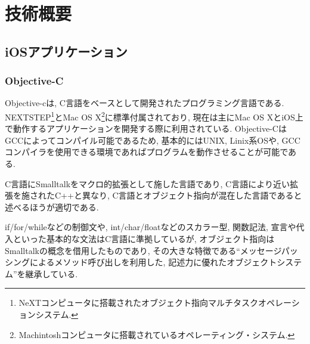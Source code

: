 \chapter{技術概要}
\label{chap:concept}

\section{iOSアプリケーション}
\subsection{Objective-C}
Objective-cは, C言語をベースとして開発されたプログラミング言語である.
NEXTSTEP\footnote{NeXTコンピュータに搭載されたオブジェクト指向マルチタスクオペレーションシステム.}とMac OS X\footnote{Machintoshコンピュータに搭載されているオペレーティング・システム.}に標準付属されており, 現在は主にMac OS XとiOS上で動作するアプリケーションを開発する際に利用されている.
Objective-CはGCCによってコンパイル可能であるため, 基本的にはUNIX, Linix系OSや, GCCコンパイラを使用できる環境であればプログラムを動作させることが可能である.

C言語にSmalltalkをマクロ的拡張として施した言語であり, C言語により近い拡張を施されたC++と異なり, C言語とオブジェクト指向が混在した言語であると述べるほうが適切である.

if/for/whileなどの制御文や, int/char/floatなどのスカラー型, 関数記法, 宣言や代入といった基本的な文法はC言語に準拠しているが, オブジェクト指向はSmalltalkの概念を借用したものであり, その大きな特徴である“メッセージパッシングによるメソッド呼び出しを利用した, 記述力に優れたオブジェクトシステム”を継承している.

